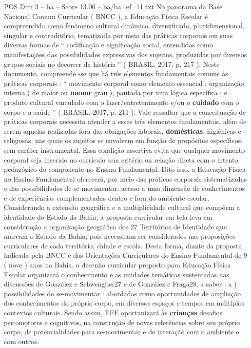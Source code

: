 \begin{textsample}{POS Dim 3 – ba – Score 13.00 – ba/ba\_ef\_11.txt}
No panorama da Base Nacional Comum Curricular ( BNCC ), a Educação Física Escolar é compreendida como fenômeno cultural dinâmico, diversificado, pluridimensional, singular e contraditório, tematizada por meio das práticas corporais em suas diversas formas de “ codificação e significação social, entendidas como manifestações das possibilidades expressivas dos sujeitos, produzidas por diversos grupos sociais no decorrer da história ” ( BRASIL, 2017, p. 217 ).
Neste documento, compreende -se que há três elementos fundamentais comuns às práticas corporais : “ movimento corporal como elemento essencial ; organização interna ( de maior ou \textbf{menor} grau ), pautada por uma lógica específica ; e produto cultural vinculado com o lazer/entretenimento e/ou o \textbf{cuidado} com o corpo e a saúde ” ( BRASIL, 2017, p. 211 ).
Vale ressaltar que a conceituação de práticas corporais necessita atender a esses três elementos fundamentais, além de serem aquelas realizadas fora das obrigações laborais, \textbf{domésticas}, higiênicas e religiosas, nas quais os sujeitos se envolvem em função de propósitos específicos, sem caráter instrumental.
Essa condição assertiva evita que qualquer movimento corporal seja inserido no currículo sem critério ou relação direta com o intento pedagógico do componente no Ensino Fundamental.
Dito isso, a Educação Física no Ensino Fundamental oferecerá, por meio das práticas corporais sistematizadas e das possibilidades de se movimentar, acesso a uma dimensão de conhecimentos e de experiências complementadas dentro e fora do ambiente escolar.
Considerando a extensão geográfica e a multiplicidade cultural que compõem a identidade do Estado da Bahia, a proposta curricular em tela leva em consideração a organização geográfica dos 27 Territórios de Identidade que marcam o Estado da Bahia, pois necessitam ser considerados nas proposições curriculares de cada território, cidade e escola.
Desta forma, diante da proposta indicada pela BNCC e das Orientações Curriculares do Ensino Fundamental de 9 ( nove ) anos na Bahia, o desenho curricular proposto para Educação Física Escolar organizará o conhecimento e as unidades temáticas sustentadas nas discussões de González e Schwengber27 e de González e Fraga28, a saber : a ) possibilidades do se-movimentar : abordadas como oportunidades de ampliação dos conhecimentos do próprio corpo, em diversos espaços e tempos em múltiplos contextos culturais.
Sendo assim, EFE oportunizará às \textbf{crianças} desafios psicomotores e cognitivos, na construção de novas referências sobre seu próprio corpo, de potencialidades para se-movimentar e de interação com o ambiente e com outros.

\end{textsample}

